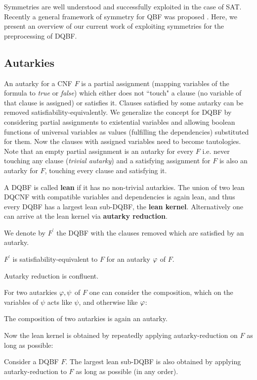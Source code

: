 \documentclass[conference]{IEEEtran}
\begin{document}
Symmetries are well understood and successfully exploited in the case of SAT. 
%
Recently a general framework of symmetry for QBF was proposed \cite{kauers2018symmetries}.
%
Here, we present an overview of our current work of exploiting symmetries for the preprocessing of DQBF.   

\subsection{Autarkies}
\label{sec:aut}
An autarky for a CNF $F$ is a partial assignment (mapping variables of the formula to \textit{true} or \textit{false}) which either does not ``touch" a clause (no variable of that clause is assigned) or satisfies it.
%
Clauses satisfied by some autarky can be removed satisfiability-equivalently. 
%
We generalize the concept for DQBF by considering partial assignments to existential variables and allowing boolean functions of universal variables as values (fulfilling the dependencies) substituted for them.
%
Now the clauses with assigned variables need to become tautologies.
%
Note that an empty partial assignment is an autarky for every $F$ i.e. never touching any clause (\textit{trivial autarky}) and a satisfying assignment for $F$ is also an autarky for $F$, touching every clause and satisfying it.

A DQBF is called \textbf{lean} if it has no non-trivial autarkies.
The union of two lean DQCNF with compatible variables and dependencies is again lean, and thus every DQBF has a largest lean sub-DQBF, the \textbf{lean kernel}.
Alternatively one can arrive at the lean kernel via \textbf{autarky reduction}.

We denote by $F^\prime$ the DQBF with the clauses removed which are satisfied by an autarky.
\begin{lem}\label{lem:autsateq}
	$F^\prime$ is satisfiability-equivalent to $F$ for an autarky $\varphi$ of $F$.
\end{lem}

\begin{lem}\label{lem:compaut}
Autarky reduction is confluent.
\end{lem}

For two autarkies $\varphi, \psi$ of $F$ one can consider the composition, %
 which on the variables of $\psi$ acts like $\psi$, and otherwise like $\varphi$:
\begin{lem}\label{lem:compaut}
	The composition of two autarkies is again an autarky.
\end{lem}
Now the lean kernel is obtained by repeatedly applying autarky-reduction on $F$ as long as possible:
\begin{lem}\label{lem:decomp}
	Consider a DQBF $F$. The largest lean sub-DQBF is also obtained by applying autarky-reduction to $F$ as long as possible (in any order).
\end{lem}
\end{document}
